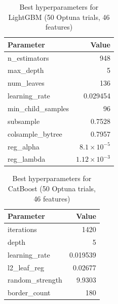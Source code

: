 \documentclass[12pt,a4paper,oneside]{report}
\begin{document}
\begin{table}[htbp]
\centering
\caption{Best hyperparameters for LightGBM (50 Optuna trials, 46 features)}
\label{tab:lgbm_v2_params}
\begin{tabular}{lr}
\toprule
\textbf{Parameter} & \textbf{Value} \\
\midrule
n\_estimators       & 948 \\
max\_depth          & 5 \\
num\_leaves         & 136 \\
learning\_rate      & 0.029454 \\
min\_child\_samples & 96 \\
subsample           & 0.7528 \\
colsample\_bytree   & 0.7957 \\
reg\_alpha          & $8.1 \times 10^{-5}$ \\
reg\_lambda         & $1.12 \times 10^{-3}$ \\
\bottomrule
\end{tabular}
\end{table}

\begin{table}[htbp]
\centering
\caption{Best hyperparameters for CatBoost (50 Optuna trials, 46 features)}
\label{tab:cat_v2_params}
\begin{tabular}{lr}
\toprule
\textbf{Parameter} & \textbf{Value} \\
\midrule
iterations          & 1420 \\
depth               & 5 \\
learning\_rate      & 0.019539 \\
l2\_leaf\_reg       & 0.02677 \\
random\_strength    & 9.9303 \\
border\_count       & 180 \\
\bottomrule
\end{tabular}
\end{table}
\end{document}
